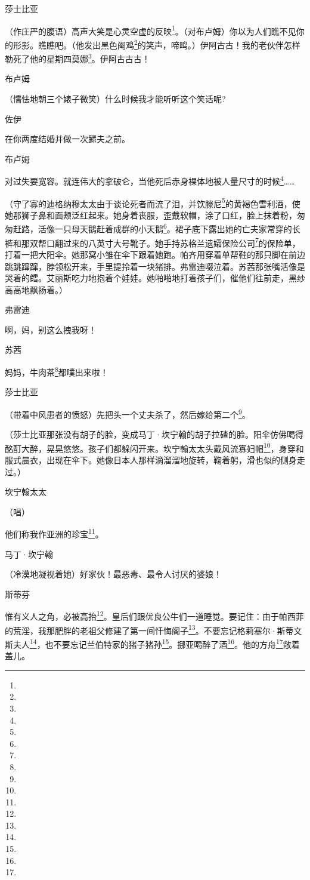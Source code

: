 \par 莎士比亚
\par （作庄严的腹语）高声大笑是心灵空虚的反映\footnote{}。（对布卢姆）你以为人们瞧不见你的形影。瞧瞧吧。（他发出黑色阉鸡\footnote{}的笑声，啼鸣。）伊阿古古！我的老伙伴怎样勒死了他的星期四莫娜\footnote{}。伊阿古古古！
\par 布卢姆
\par （懦怯地朝三个婊子微笑）什么时候我才能听听这个笑话呢?
\par 佐伊
\par 在你两度结婚并做一次鳏夫之前。
\par 布卢姆
\par 对过失要宽容。就连伟大的拿破仑，当他死后赤身裸体地被人量尺寸的时候\footnote{}……
\par （守了寡的迪格纳穆太太由于谈论死者而流了泪，并饮滕尼\footnote{}的黄褐色雪利酒，使她那狮子鼻和面颊泛红起来。她身着丧服，歪戴软帽，涂了口红，脸上抹着粉，匆匆赶路，活像一只母天鹅赶着成群的小天鹅\footnote{}。裙子底下露出她的亡夫家常穿的长裤和那双帮口翻过来的八英寸大号靴子。她手持苏格兰遗孀保险公司\footnote{}的保险单，打着一把大阳伞。她那窝小雏在伞下跟着她跑。帕齐用穿着单帮鞋的那只脚在前边跳跳蹿蹿，脖领松开来，手里提拎着一块猪排。弗雷迪啜泣着。苏茜那张嘴活像是哭着的鳕。艾丽斯吃力地抱着个娃娃。她啪啪地打着孩子们，催他们往前走，黑纱高高地飘扬着。）
\par 弗雷迪
\par 啊，妈，别这么拽我呀！
\par 苏茜
\par 妈妈，牛肉茶\footnote{}都噗出来啦！
\par 莎士比亚
\par （带着中风患者的愤怒）先把头一个丈夫杀了，然后嫁给第二个\footnote{}。
\par （莎士比亚那张没有胡子的脸，变成马丁·坎宁翰的胡子拉碴的脸。阳伞仿佛喝得酩酊大醉，晃晃悠悠。孩子们都躲闪开来。坎宁翰太太头戴风流寡妇帽\footnote{}，身穿和服式晨衣，出现在伞下。她像日本人那样滴溜溜地旋转，鞠着躬，滑也似的侧身走过。）
\par 坎宁翰太太
\par （唱）
\par 他们称我作亚洲的珍宝\footnote{}。
\par 马丁·坎宁翰
\par （冷漠地凝视着她）好家伙！最恶毒、最令人讨厌的婆娘！
\par 斯蒂芬
\par 惟有义人之角，必被高抬\footnote{}。皇后们跟优良公牛们一道睡觉。要记住：由于帕西菲的荒淫，我那肥胖的老祖父修建了第一间忏悔阁子\footnote{}。不要忘记格莉塞尔·斯蒂文斯夫人\footnote{}，也不要忘记兰伯特家的猪子猪孙\footnote{}。挪亚喝醉了酒\footnote{}。他的方舟\footnote{}敞着盖儿。
